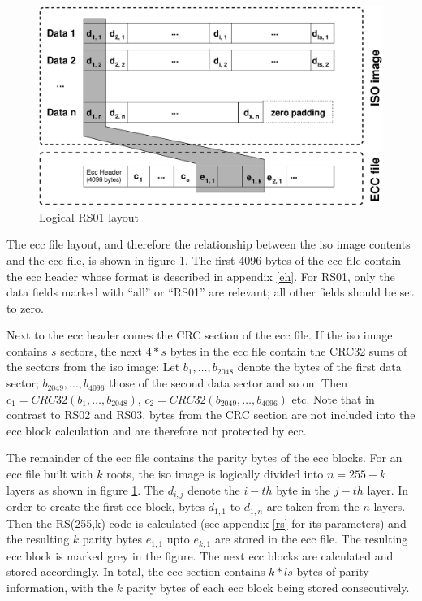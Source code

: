 \begin{figure}
 \begin{center}
 \includegraphics[width=\textwidth]{rs01-layout.eps}
 \caption{Logical RS01 layout}
 \label{layout-logical-one}
 \end{center}
\end{figure}

The ecc file layout, and therefore the relationship between the iso image
contents and the ecc file, is shown in 
figure \ref{layout-logical-one}. The first 4096 bytes of the ecc file
contain the ecc header whose format is described in appendix \ref{eh}.
For RS01, only the data fields marked with ``all'' or ``RS01'' are
relevant; all other fields should be set to zero.

Next to the ecc header comes the CRC section of the ecc file. If the
iso image contains $s$ sectors, the next $4*s$ bytes in the ecc file
contain the CRC32 sums of the sectors from the iso image: Let $b_1,\dots,b_{2048}$ denote 
the bytes of the first data sector; $b_{2049},\dots,b_{4096}$ those of the
second data sector and so on. Then $c_1 = CRC32(b_1,\dots,b_{2048})$,
$c_2 = CRC32(b_{2049},\dots,b_{4096})$ etc. Note that in contrast to
RS02 and RS03, bytes from the CRC section are not included into the ecc block
calculation and are therefore not protected by ecc.

\smallskip

The remainder of the ecc file contains the parity bytes of the
ecc blocks. For an ecc file built with $k$ roots, 
the iso image is logically divided into 
$n = 255-k$ layers as shown in figure \ref{layout-logical-one}.
The $d_{i,j}$ denote the $i-th$ byte in the $j-th$ layer.
In order to create the first ecc block, bytes $d_{1,1}$ to  $d_{1,n}$ are taken from the
$n$ layers. Then the RS(255,k) code is calculated (see appendix \ref{rs} for its parameters)
and the 
resulting $k$ parity bytes $e_{1,1}$ upto $e_{k,1}$ are stored
in the ecc file. The resulting ecc block is marked grey in the
figure. The next ecc blocks are calculated and stored accordingly.
In total, the ecc section contains $k*ls$ bytes of parity information,
with the $k$ parity bytes of each ecc block being stored consecutively.

